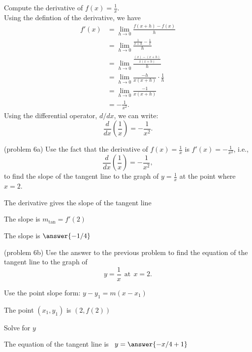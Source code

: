 \documentclass{ximera}
\begin{document}
\begin{example}[example 6]
Compute the derivative of $f(x) = \displaystyle{\frac{1}{x}}$.\\
Using the defintion of the derivative, we have
\begin{align*}
f'(x) &= \lim_{h \to 0} \frac{f(x+h)-f(x)}{h}\\[5pt]
&= \lim_{h \to 0} \frac{\frac{1}{x+h}- \frac{1}{x}}{h}\\[5pt]
&= \lim_{h \to 0} \frac{\frac{(x) - (x+h)}{x(x+h)}}{h} \\[5pt]
&=  \lim_{h \to 0} \frac{-h}{x(x+h)}\cdot \frac{1}{h}\\[5pt]
&= \lim_{h \to 0} \frac{-1}{x(x+h)} \\[5pt]
&= -\frac{1}{x^2}.
\end{align*}
Using the differential operator, $d/dx$, we can write:
\[
 \frac{d}{dx}\left({\frac{1}{x}}\right) = -\frac{1}{x^2}.
\]
\end{example}




\begin{problem}(problem 6a)
Use the fact that the derivative of $f(x) = \frac{1}{x}$ is $f'(x) = -\frac{1}{x^2}$,
i.e., 
\[
\frac{d}{dx}\left(\frac{1}{x}\right) = -\frac{1}{x^2},
\]
to find the slope of the tangent line to the graph of 
$y = \frac{1}{x}$ at the point where $x = 2$.\\
\begin{hint}
The derivative gives the slope of the tangent line
\end{hint}
\begin{hint}
The slope is $m_{\text{tan}} = f'(2)$
\end{hint}
The slope is $\answer{-1/4}$
\end{problem}




\begin{problem}(problem 6b)
Use the answer to the previous problem to find the equation of the tangent line to the graph of 
\[
y = \frac{1}{x} \ \ \text{at} \  \ x=2.
\]
\begin{hint}
Use the point slope form: $y-y_1 = m(x-x_1)$
\end{hint}
\begin{hint}
The point $(x_1,y_1)$ is $(2, f(2))$
\end{hint}
\begin{hint}
Solve for $y$
\end{hint}
The equation of the tangent line is \ $y = \answer{-x/4 + 1}$
\end{problem}
\end{document}
